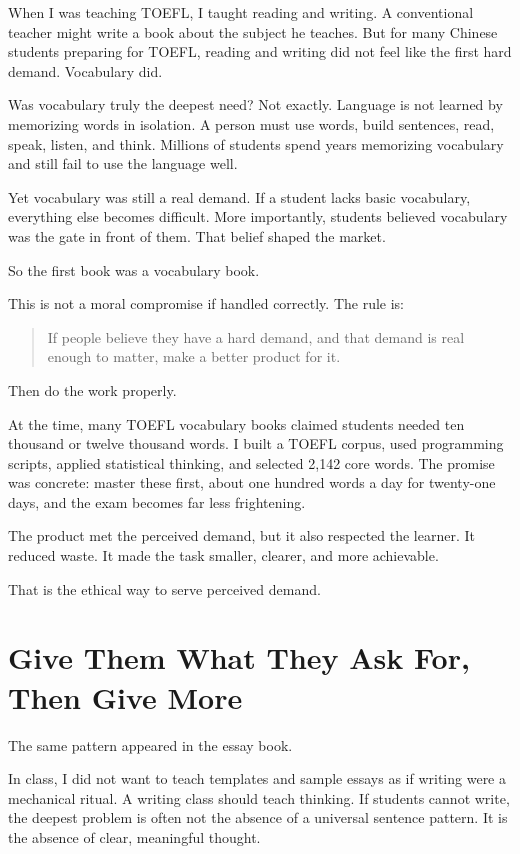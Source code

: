 When I was teaching TOEFL, I taught reading and writing. A conventional teacher might write a book about the subject he teaches. But for many Chinese students preparing for TOEFL, reading and writing did not feel like the first hard demand. Vocabulary did.

Was vocabulary truly the deepest need? Not exactly. Language is not learned by memorizing words in isolation. A person must use words, build sentences, read, speak, listen, and think. Millions of students spend years memorizing vocabulary and still fail to use the language well.

Yet vocabulary was still a real demand. If a student lacks basic vocabulary, everything else becomes difficult. More importantly, students believed vocabulary was the gate in front of them. That belief shaped the market.

So the first book was a vocabulary book.

This is not a moral compromise if handled correctly. The rule is:

\begin{quote}
If people believe they have a hard demand, and that demand is real enough to matter, make a better product for it.
\end{quote}

Then do the work properly.

At the time, many TOEFL vocabulary books claimed students needed ten thousand or twelve thousand words. I built a TOEFL corpus, used programming scripts, applied statistical thinking, and selected 2,142 core words. The promise was concrete: master these first, about one hundred words a day for twenty-one days, and the exam becomes far less frightening.

The product met the perceived demand, but it also respected the learner. It reduced waste. It made the task smaller, clearer, and more achievable.

That is the ethical way to serve perceived demand.

\section*{Give Them What They Ask For, Then Give More}

The same pattern appeared in the essay book.

In class, I did not want to teach templates and sample essays as if writing were a mechanical ritual. A writing class should teach thinking. If students cannot write, the deepest problem is often not the absence of a universal sentence pattern. It is the absence of clear, meaningful thought.

